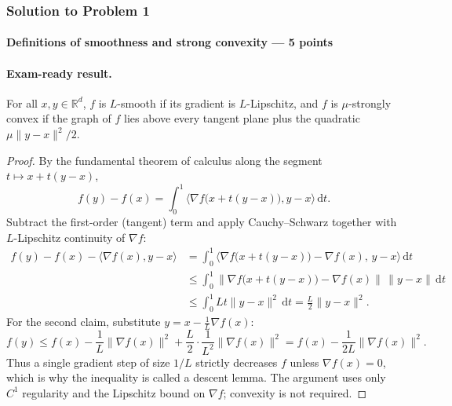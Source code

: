 \documentclass[11pt,a4paper]{article}
\theoremstyle{definition}
\begin{document}
\subsubsection{Solution to Problem 1}\label{sol:spr2025-opt-1}

\paragraph{Definitions of smoothness and strong convexity --- 5 points}

\paragraph{Exam-ready result.}
For all $x,y\in\mathbb{R}^d$, $f$ is $L$-smooth if its gradient is $L$-Lipschitz, and $f$ is $\mu$-strongly convex if the graph of $f$ lies above every tangent plane plus the quadratic $\mu\|y-x\|^2/2$.


\begin{proof}
By the fundamental theorem of calculus along the segment $t\mapsto x+t(y-x)$,
\[
f(y)-f(x)
=\int_0^1\langle\nabla f\bigl(x+t(y-x)\bigr),y-x\rangle\,\mathrm{d}t.
\]
Subtract the first-order (tangent) term and apply Cauchy--Schwarz together with $L$-Lipschitz continuity of $\nabla f$:
\begin{align*}
f(y)-f(x)-\langle\nabla f(x),y-x\rangle
&=\int_0^1\bigl\langle\nabla f\bigl(x+t(y-x)\bigr)-\nabla f(x),\,y-x\bigr\rangle\,\mathrm{d}t \\
&\leq\int_0^1\bigl\|\nabla f\bigl(x+t(y-x)\bigr)-\nabla f(x)\bigr\|\,\|y-x\|\,\mathrm{d}t \\
&\leq\int_0^1 Lt\|y-x\|^2\,\mathrm{d}t
=\frac{L}{2}\|y-x\|^2.
\end{align*}
For the second claim, substitute $y=x-\frac1L\nabla f(x)$:
\[
f(y)
\leq f(x)-\frac1L\|\nabla f(x)\|^2+\frac{L}{2}\cdot\frac1{L^2}\|\nabla f(x)\|^2
=f(x)-\frac1{2L}\|\nabla f(x)\|^2.
\]
Thus a single gradient step of size $1/L$ strictly decreases $f$ unless $\nabla f(x)=0$, which is why the inequality is called a descent lemma. The argument uses only $C^1$ regularity and the Lipschitz bound on $\nabla f$; convexity is not required.
\end{proof}
\end{document}

